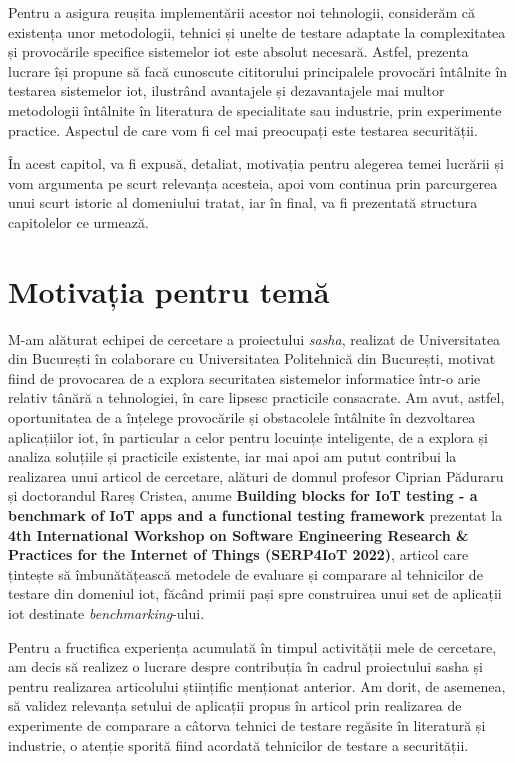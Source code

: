 Pentru a asigura reușita implementării acestor noi tehnologii, considerăm că existența unor metodologii, tehnici și unelte de testare adaptate la complexitatea și provocările specifice sistemelor \acrshort{iot} este absolut necesară. Astfel, prezenta lucrare își propune să facă cunoscute cititorului principalele provocări întâlnite în testarea sistemelor \acrshort{iot}, ilustrând avantajele și dezavantajele mai multor metodologii întâlnite în literatura de specialitate sau industrie, prin experimente practice. Aspectul de care vom fi cel mai preocupați este testarea securității.

În acest capitol, va fi expusă, detaliat, motivația pentru alegerea temei lucrării și vom argumenta pe scurt relevanța acesteia, apoi vom continua prin parcurgerea unui scurt istoric al domeniului tratat, iar în final, va fi prezentată structura capitolelor ce urmează.

\section{Motivația pentru temă}

M-am alăturat echipei de cercetare a proiectului \textit{\acrfull{sasha}}, realizat de Universitatea din București în colaborare cu Universitatea Politehnică din București, motivat fiind de provocarea de a explora securitatea sistemelor informatice într-o arie relativ tânără a tehnologiei, în care lipsesc practicile consacrate. Am avut, astfel, oportunitatea de a înțelege provocările și obstacolele întâlnite în dezvoltarea aplicațiilor \acrshort{iot}, în particular a celor pentru locuințe inteligente, de a explora și analiza soluțiile și practicile existente, iar mai apoi am putut contribui la realizarea unui articol de cercetare, alături de domnul profesor Ciprian Păduraru și doctorandul Rareș Cristea, anume \textbf{Building blocks for IoT testing - a benchmark of IoT apps and a functional testing framework} prezentat la \textbf{4th International Workshop on Software Engineering Research \& Practices for the Internet of Things (SERP4IoT 2022)}, articol care țintește să îmbunătățească metodele de evaluare și comparare al tehnicilor de testare din domeniul \acrlong{iot}, făcând primii pași spre construirea unui set de aplicații \acrshort{iot} destinate \textit{benchmarking}-ului.

Pentru a fructifica experiența acumulată în timpul activității mele de cercetare, am decis să realizez o lucrare despre contribuția în cadrul proiectului \acrshort{sasha} și pentru realizarea articolului științific menționat anterior. Am dorit, de asemenea, să validez relevanța setului de aplicații propus în articol prin realizarea de experimente de comparare a câtorva tehnici de testare regăsite în literatură și industrie, o atenție sporită fiind acordată tehnicilor de testare a securității.

